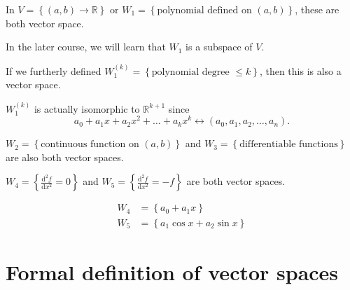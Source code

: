 \begin{eg}
    In \(V = \left\{ (a,b) \to \mathbb{R}  \right\} \) or \(W_1 = \left\{ \text{polynomial defined on } (a, b) \right\} \), these are both vector space. 
\end{eg}
\begin{remark}
    In the later course, we will learn that \(W_1\) is a subspace of \(V\).  
\end{remark}

\begin{eg}
    If we furtherly defined \(W_1^{(k)} = \left\{ \text{polynomial degree } \le k \right\} \), then this is also a vector space. 
\end{eg}

\begin{remark}
    \(W_1^{(k)}\) is actually isomorphic to \(\mathbb{R} ^{k+1}\) since
    \[
        a_0 + a_{1}x + a_2 x^2 + \dots + a_k x^k \leftrightarrow (a_0, a_1, a_2, \dots , a_n). 
    \]  
\end{remark}

\begin{eg}
    \(W_2 = \left\{ \text{continuous function on } (a,b) \right\} \) and \(W_3 = \left\{  \text{differentiable functions} \right\} \) are also both vector spaces.  
\end{eg}

\begin{eg}
    \(W_4 = \left\{ \frac{\mathrm{d}^2 f}{\mathrm{d}x^2} = 0  \right\} \) and \(W_5 = \left\{ \frac{\mathrm{d} ^2 f}{\mathrm{d}x ^2} = -f  \right\} \) are both vector spaces. 
\end{eg}
\begin{explanation}
    \begin{align*}
        W_4 &= \left\{ a_0 + a_1 x \right\} \\
        W_5 &= \left\{ a_1 \cos x + a_2 \sin x \right\} 
    \end{align*}
\end{explanation}

\section{Formal definition of vector spaces}
